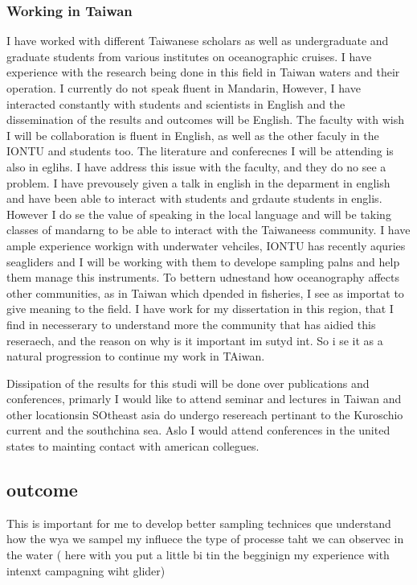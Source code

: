 \documentclass[letterpaper, 12pt ]{article}
\begin{document}
\subsubsection*{Working in Taiwan}
I have worked with different Taiwanese scholars as well as undergraduate and graduate students from various institutes on oceanographic cruises. I have experience with the research being done in this field in Taiwan waters and their operation.
I currently do not speak fluent in Mandarin, However, I have interacted constantly with students and scientists in English and the dissemination of the results and outcomes will be English. The faculty with wish I will be collaboration is fluent in English, as well as the other faculy in the IONTU and students too. The literature and conferecnes I will be attending is also in eglihs. I have address this issue with the faculty, and they do no see a problem. I have prevousely given a talk in english in the deparment in english and have been able to interact with students and grdaute students in englis. However I do se the value of speaking in the local language and will be taking classes of mandarng to be able to interact with the Taiwaneess community. 
I have ample experience workign with underwater vehciles, IONTU has recently aquries seagliders and I will be working with them to develope sampling palns and help them manage this instruments. 
To bettern udnestand how oceanography affects other communities, as in Taiwan which dpended in fisheries, I see as importat to give meaning to the field. I have work for my dissertation in this region, that I find in necesserary to understand more the community that has aidied this reseraech, and the reason on why is it important im sutyd int. So i se it as a natural progression to continue my work in TAiwan. 

Dissipation of the results for this studi will be done over publications and conferences, primarly I would like to attend seminar and lectures in Taiwan and other locationsin SOtheast asia do undergo resereach pertinant to the Kuroschio current and the southchina sea. Aslo  I would attend conferences in the united states to mainting contact with american collegues. 


\subsection{outcome}
This is important for me to develop better sampling technices que understand how the wya we sampel my influece the type of processe taht we can observec in the water ( here with you put a little bi tin the begginign my experience with intenxt campagning wiht glider) 
\end{document}
